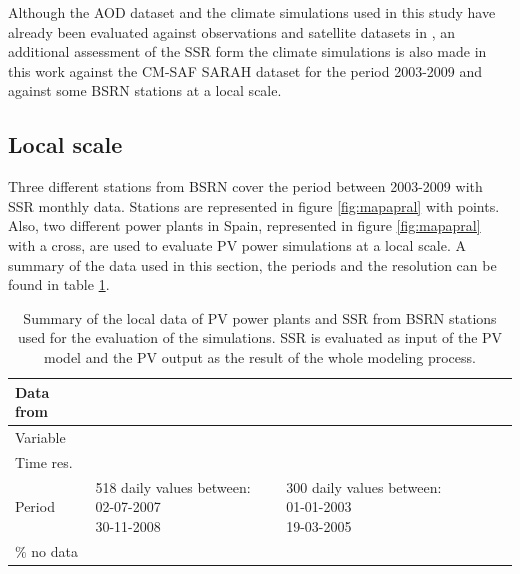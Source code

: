 Although the AOD dataset and the climate simulations used in this study have already been evaluated against observations and satellite datasets in \cite{Nabat2013, Nabat2014, Nabat2014a}, an additional assessment of the SSR form the climate simulations is also made in this work against the CM-SAF SARAH dataset \citep{Muller2015} for the period 2003-2009 and against some BSRN \citep{Ohmura1998} stations at a local scale. 
\subsection{Local scale}

Three different stations from BSRN cover the period between 2003-2009 with SSR monthly data. Stations are represented in figure \ref{fig:mapapral} with points. Also, two different power plants in Spain, represented in figure \ref{fig:mapapral} with a cross, are used to evaluate PV power simulations at a local scale. A summary of the data used in this section, the periods and the resolution can be found in table \ref{localData}.


\begin{table}[h!]
  \begin{tabular}{>{\raggedright}m{2cm}>{\raggedright}m{2cm}>{\raggedright}m{2cm}>{\raggedright}m{2cm}>{\raggedright}m{2cm}>{\raggedright}m{2cm}}
    \toprule 
    Data from & \centering{Seville} & \centering{Tarragona} & \centering{Payerne} &\centering{Sede Boker} &\centering{Carpentras}\tabularnewline
    \midrule
    Variable & \centering{PV productivity} & \centering{PV productivity} & \centering{SSR} & \centering{SSR} & \centering{SSR} 
\tabularnewline
    \midrule
    Time res. & \centering{day} & \centering{day} & \centering{month} & \centering{month} & \centering{month}
                    \tabularnewline
   \midrule
                                                                                            Period & \centering{518 {\small{daily values between:}} 02-07-2007\\30-11-2008} & \centering{300 {\small{daily values between:}} 01-01-2003\\19-03-2005} & \centering{2003-2009} & \centering{2003-2009} & \centering{2003-2009}
                  \tabularnewline    
 \midrule
    $\%$ no data & \centering{0} & \centering{8 $\%$} & \centering{0} & \centering{10.71 $\%$} & \centering{0}
                    \tabularnewline

 \bottomrule
  \end{tabular}
  \caption{Summary of the local data of PV power plants and SSR from BSRN stations used for the evaluation of the simulations. SSR is evaluated as input of the PV model and the PV output as the result of the whole modeling process.}
  \label{localData}
\end{table}

